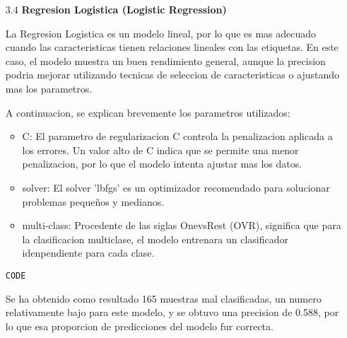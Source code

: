 \documentclass{article}
\begin{document}
\begin{itemize}

\item[3.4]  {\bf Regresion Logistica (Logistic Regression)}

La Regresion Logistica es un modelo lineal, por lo que es mas adecuado cuando las caracteristicas tienen relaciones lineales con las etiquetas. En este caso, el modelo muestra un buen rendimiento general, aunque la precision podria mejorar utilizando tecnicas de seleccion de caracteristicas o ajustando mas los parametros.

A continuacion, se explican brevemente los parametros utilizados:

\begin{itemize}

\item
C: El parametro de regularizacion C controla la penalizacion aplicada a los errores. Un valor alto de C indica que se permite una menor penalizacion, por lo que el modelo intenta ajustar mas los datos.

\item
solver: El solver 'lbfgs' es un optimizador recomendado para solucionar problemas pequeños y medianos.

\item
multi-class: Procedente de las siglas OnevsRest (OVR), significa que para la
clasificacion multiclase, el modelo entrenara un clasificador idenpendiente para cada 
clase.

\end{itemize}

\begin{tcolorbox}[width=14cm]
\begin{scriptsize}
\begin{verbatim}
CODE
\end{verbatim}
\end{scriptsize}
\end{tcolorbox}

Se ha obtenido como resultado 165 muestras mal clasificadas, un numero relativamente bajo para este modelo, y se obtuvo una precision de 0.588, por lo que esa proporcion de  predicciones del modelo fur correcta.

\end{itemize}

\bigskip
\end{document}
